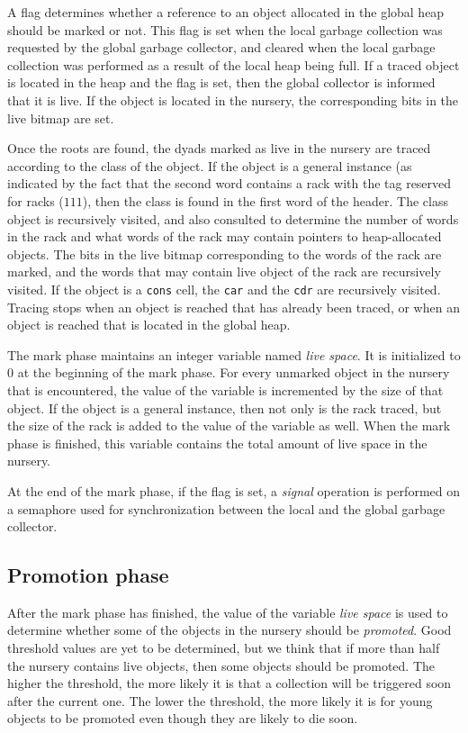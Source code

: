 A flag determines whether a reference to an object allocated in the
global heap should be marked or not.  This flag is set when the local
garbage collection was requested by the global garbage collector, and
cleared when the local garbage collection was performed as a result of
the local heap being full.  If a traced object is located in the heap
and the flag is set, then the global collector is informed that it is
live.  If the object is located in the nursery, the corresponding bits
in the live bitmap are set.

Once the roots are found, the dyads marked as live in the nursery are
traced according to the class of the object.  If the object is a
general instance (as indicated by the fact that the second word
contains a rack with the tag reserved for racks ($111$), then the
class is found in the first word of the header.  The class object is
recursively visited, and also consulted to determine the number of
words in the rack and what words of the rack may contain pointers to
heap-allocated objects.  The bits in the live bitmap corresponding to
the words of the rack are marked, and the words that may contain live
object of the rack are recursively visited.  If the object is a
\texttt{cons} cell, the \texttt{car} and the \texttt{cdr} are
recursively visited.  Tracing stops when an object is reached that has
already been traced, or when an object is reached that is located in
the global heap.

The mark phase maintains an integer variable named \emph{live space}.
It is initialized to $0$ at the beginning of the mark phase.  For
every unmarked object in the nursery that is encountered, the value of
the variable is incremented by the size of that object.  If the object
is a general instance, then not only is the rack traced, but the size
of the rack is added to the value of the variable as well.  When the
mark phase is finished, this variable contains the total amount of
live space in the nursery.

At the end of the mark phase, if the flag is set, a \emph{signal}
operation is performed on a semaphore used for synchronization between
the local and the global garbage collector.

\subsection{Promotion phase}

After the mark phase has finished, the value of the variable
\emph{live space} is used to determine whether some of the
objects in the nursery should be \emph{promoted}.  Good threshold
values are yet to be determined, but we think that if more than half
the nursery contains live objects, then some objects should be
promoted.  The higher the threshold, the more likely it is that a
collection will be triggered soon after the current one.  The lower
the threshold, the more likely it is for young objects to be promoted
even though they are likely to die soon.


